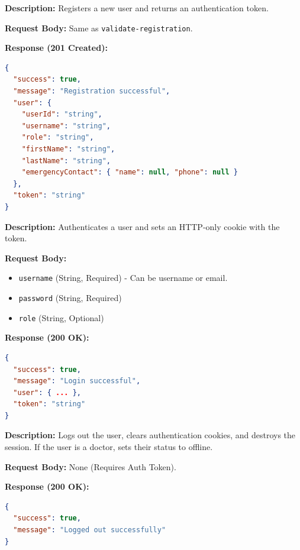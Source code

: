 \documentclass{article}
\begin{document}
\begin{tcolorbox}[title=\textcolor{accent}{POST} /api/auth/register]
\textbf{Description:} Registers a new user and returns an authentication token.

\vspace{0.5em}
\textbf{Request Body:} Same as \texttt{validate-registration}.

\vspace{0.5em}
\textbf{Response (201 Created):}
\begin{lstlisting}[language=json]
{
  "success": true,
  "message": "Registration successful",
  "user": {
    "userId": "string",
    "username": "string",
    "role": "string",
    "firstName": "string",
    "lastName": "string",
    "emergencyContact": { "name": null, "phone": null }
  },
  "token": "string"
}
\end{lstlisting}
\end{tcolorbox}

\begin{tcolorbox}[title=\textcolor{accent}{POST} /api/auth/login]
\textbf{Description:} Authenticates a user and sets an HTTP-only cookie with the token.

\vspace{0.5em}
\textbf{Request Body:}
\begin{itemize}
    \item \texttt{username} (String, Required) - Can be username or email.
    \item \texttt{password} (String, Required)
    \item \texttt{role} (String, Optional)
\end{itemize}

\vspace{0.5em}
\textbf{Response (200 OK):}
\begin{lstlisting}[language=json]
{
  "success": true,
  "message": "Login successful",
  "user": { ... },
  "token": "string"
}
\end{lstlisting}
\end{tcolorbox}

\begin{tcolorbox}[title=\textcolor{accent}{POST} /api/auth/logout]
\textbf{Description:} Logs out the user, clears authentication cookies, and destroys the session. If the user is a doctor, sets their status to offline.

\vspace{0.5em}
\textbf{Request Body:} None (Requires Auth Token).

\vspace{0.5em}
\textbf{Response (200 OK):}
\begin{lstlisting}[language=json]
{
  "success": true,
  "message": "Logged out successfully"
}
\end{lstlisting}
\end{tcolorbox}
\end{document}
